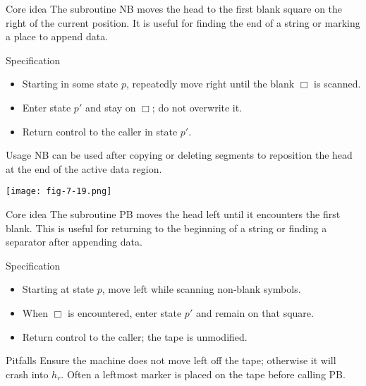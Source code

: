 \begin{frame}[t]{}
  \begin{tblock}{Core idea}
    The subroutine \textsc{NB} moves the head to the first blank
    square on the right of the current position.  It is useful for
    finding the end of a string or marking a place to append data.
  \end{tblock}
  \begin{tblock}{Specification}
    \begin{itemize}
      \item Starting in some state $p$, repeatedly move right until
        the blank $\Box$ is scanned.
      \item Enter state $p'$ and stay on $\Box$; do not overwrite it.
      \item Return control to the caller in state $p'$.
    \end{itemize}
  \end{tblock}
  \begin{talert}{Usage}
    \textsc{NB} can be used after copying or deleting segments to
    reposition the head at the end of the active data region.
  \end{talert}
  \centering
  \texttt{[image: fig-7-19.png]} %
  \label{fr:7.4-04}
\end{frame}

\begin{frame}[t]{}
  \begin{tblock}{Core idea}
    The subroutine \textsc{PB} moves the head left until it encounters
    the first blank.  This is useful for returning to the beginning of
    a string or finding a separator after appending data.
  \end{tblock}
  \begin{tblock}{Specification}
    \begin{itemize}
      \item Starting at state $p$, move left while scanning non‑blank
        symbols.
      \item When $\Box$ is encountered, enter state $p'$ and remain on
        that square.
      \item Return control to the caller; the tape is unmodified.
    \end{itemize}
  \end{tblock}
  \begin{talert}{Pitfalls}
    Ensure the machine does not move left off the tape; otherwise it
    will crash into $h_r$.  Often a leftmost marker is placed on the
    tape before calling \textsc{PB}.
  \end{talert}
  \label{fr:7.4-05}
\end{frame}

